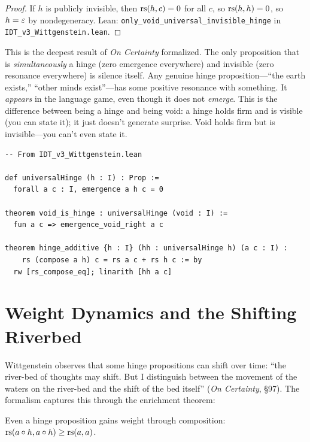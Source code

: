 \begin{proof}
If $h$ is publicly invisible, then $\mathrm{rs}(h, c) = 0$ for all $c$, so
$\mathrm{rs}(h, h) = 0$, so $h = \varepsilon$ by nondegeneracy.
Lean: \texttt{only\_void\_universal\_invisible\_hinge} in \texttt{IDT\_v3\_Wittgenstein.lean}.
\end{proof}

\begin{interpretation}
This is the deepest result of \textit{On Certainty} formalized. The only
proposition that is \emph{simultaneously} a hinge (zero emergence everywhere)
and invisible (zero resonance everywhere) is silence itself. Any genuine
hinge proposition---``the earth exists,'' ``other minds exist''---has some
positive resonance with something. It \emph{appears} in the language game,
even though it does not \emph{emerge}. This is the difference between
being a hinge and being void: a hinge holds firm and is visible (you can
state it); it just doesn't generate surprise. Void holds firm but is
invisible---you can't even state it.
\end{interpretation}

\begin{lstlisting}
-- From IDT_v3_Wittgenstein.lean

def universalHinge (h : I) : Prop :=
  forall a c : I, emergence a h c = 0

theorem void_is_hinge : universalHinge (void : I) :=
  fun a c => emergence_void_right a c

theorem hinge_additive {h : I} (hh : universalHinge h) (a c : I) :
    rs (compose a h) c = rs a c + rs h c := by
  rw [rs_compose_eq]; linarith [hh a c]
\end{lstlisting}

\section{Weight Dynamics and the Shifting Riverbed}

Wittgenstein observes that some hinge propositions can shift over time:
``the river-bed of thoughts may shift. But I distinguish between the
movement of the waters on the river-bed and the shift of the bed itself''
(\textit{On Certainty}, \S97). The formalism captures this through the
enrichment theorem:

\begin{theorem}
\label{thm:hinge-weight}
Even a hinge proposition gains weight through composition:
$\mathrm{rs}(a \circ h, a \circ h) \geq \mathrm{rs}(a, a)$.
\end{theorem}

